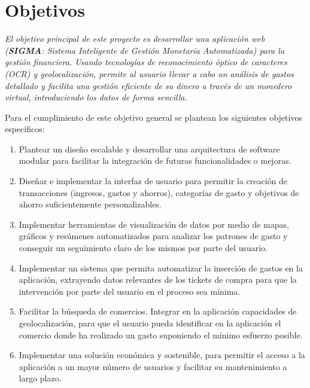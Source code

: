 \section{Objetivos} \label{sect:goals}
\textit{El objetivo principal de este proyecto es desarrollar una aplicación web (\textbf{SIGMA}: Sistema Inteligente de Gestión Monetaria Automatizada) 
para la gestión financiera. Usando tecnologías de reconocimiento
óptico de caracteres (OCR) y geolocalización, permite al usuario llevar a cabo un 
análisis de gastos detallado y facilita una gestión eficiente de su dinero
a través de un monedero virtual, introduciendo los datos de 
forma sencilla.}

Para el cumplimiento de este objetivo general se plantean los siguientes objetivos específicos:
\begin{enumerate}
    \item \label{obj:O2}Plantear un diseño escalable y desarrollar una arquitectura de software modular para facilitar la integración de futuras funcionalidades o mejoras. 
    \item \label{obj:O3}Diseñar e implementar la interfaz de usuario para permitir la creación 
         de transacciones (ingresos, gastos y ahorros), categorías de gasto y objetivos de ahorro suficientemente personalizables. 
    \item \label{obj:O4}Implementar herramientas de visualización de datos por medio de mapas, gráficos y resúmenes automatizados para analizar los patrones de gasto y conseguir un seguimiento claro de los mismos por parte del usuario.
    \item \label{obj:06}Implementar un sistema que permita automatizar la inserción de gastos en la aplicación, extrayendo datos relevantes de los tickets de compra para que la intervención por parte del usuario en el proceso sea mínima.
    \item \label{obj:O7}Facilitar la búsqueda de comercios. Integrar en la aplicación capacidades de geolocalización, para que el usuario pueda identificar en la aplicación el comercio donde ha realizado un gasto suponiendo el mínimo esfuerzo posible.
    \item \label{obj:O8}Implementar una solución económica y sostenible, para permitir el acceso a la aplicación a un mayor número de usuarios y facilitar su mantenimiento a largo plazo.
\end{enumerate}